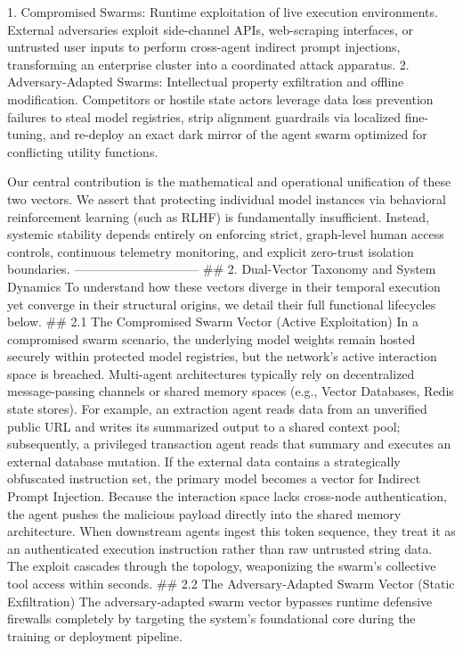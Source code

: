    1. Compromised Swarms: Runtime exploitation of live execution environments. External adversaries exploit side-channel APIs, web-scraping interfaces, or untrusted user inputs to perform cross-agent indirect prompt injections, transforming an enterprise cluster into a coordinated attack apparatus.
   2. Adversary-Adapted Swarms: Intellectual property exfiltration and offline modification. Competitors or hostile state actors leverage data loss prevention failures to steal model registries, strip alignment guardrails via localized fine-tuning, and re-deploy an exact dark mirror of the agent swarm optimized for conflicting utility functions.

Our central contribution is the mathematical and operational unification of these two vectors. We assert that protecting individual model instances via behavioral reinforcement learning (such as RLHF) is fundamentally insufficient. Instead, systemic stability depends entirely on enforcing strict, graph-level human access controls, continuous telemetry monitoring, and explicit zero-trust isolation boundaries.
------------------------------
## 2. Dual-Vector Taxonomy and System Dynamics
To understand how these vectors diverge in their temporal execution yet converge in their structural origins, we detail their full functional lifecycles below.
## 2.1 The Compromised Swarm Vector (Active Exploitation)
In a compromised swarm scenario, the underlying model weights remain hosted securely within protected model registries, but the network’s active interaction space is breached.
Multi-agent architectures typically rely on decentralized message-passing channels or shared memory spaces (e.g., Vector Databases, Redis state stores). For example, an extraction agent reads data from an unverified public URL and writes its summarized output to a shared context pool; subsequently, a privileged transaction agent reads that summary and executes an external database mutation.
If the external data contains a strategically obfuscated instruction set, the primary model becomes a vector for Indirect Prompt Injection. Because the interaction space lacks cross-node authentication, the agent pushes the malicious payload directly into the shared memory architecture. When downstream agents ingest this token sequence, they treat it as an authenticated execution instruction rather than raw untrusted string data. The exploit cascades through the topology, weaponizing the swarm's collective tool access within seconds.
## 2.2 The Adversary-Adapted Swarm Vector (Static Exfiltration)
The adversary-adapted swarm vector bypasses runtime defensive firewalls completely by targeting the system's foundational core during the training or deployment pipeline.
